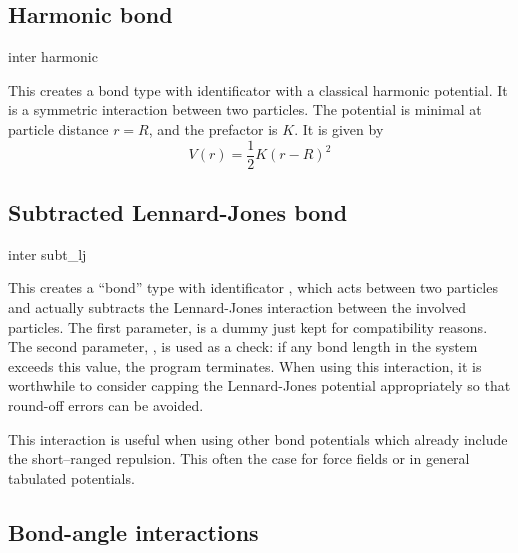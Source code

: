 \subsection{Harmonic bond}

\begin{essyntax}
  inter 
  harmonic  
\end{essyntax}
This creates a bond type with identificator  with a
classical harmonic potential. It is a symmetric interaction between two
particles. The potential is minimal at particle distance $r=R$, and the
prefactor is $K$. It is given by
\begin{equation}
  V(r) = \frac{1}{2} K \left( r - R \right)^2
\end{equation}

\subsection{Subtracted Lennard-Jones bond}

\begin{essyntax}
  inter 
  subt_lj
   
\end{essyntax}
This creates a ``bond'' type with identificator , which
acts between two particles and actually subtracts the Lennard-Jones interaction
between the involved particles.  The first parameter,  is a dummy
just kept for compatibility reasons. The second parameter, , is used as a
check: if any bond length in the system exceeds this value, the program
terminates. When using this interaction, it is worthwhile to consider
capping the Lennard-Jones potential appropriately so that round-off errors can
be avoided.

This interaction is useful when using other bond potentials which already
include the short--ranged repulsion. This often the case for force fields or in
general tabulated potentials.

\subsection{Bond-angle interactions}
\label{sec:angle}

